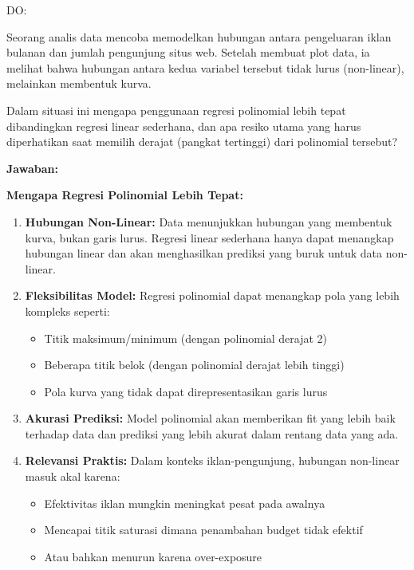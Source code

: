 \documentclass[a4paper]{article}
\begin{document}
\begin{enumerate}[itemsep=1em,leftmargin=*]
  DO:

  Seorang analis data mencoba memodelkan hubungan antara pengeluaran iklan bulanan dan jumlah pengunjung situs web. Setelah membuat plot data, ia melihat bahwa hubungan antara kedua variabel tersebut tidak lurus (non-linear), melainkan membentuk kurva.

  Dalam situasi ini mengapa penggunaan regresi polinomial lebih tepat dibandingkan regresi linear sederhana, dan apa resiko utama yang harus diperhatikan saat memilih derajat (pangkat tertinggi) dari polinomial tersebut?
  
  \textbf{Jawaban:}
  
  \textbf{Mengapa Regresi Polinomial Lebih Tepat:}
  
  \begin{enumerate}
    \item \textbf{Hubungan Non-Linear:} Data menunjukkan hubungan yang membentuk kurva, bukan garis lurus. Regresi linear sederhana hanya dapat menangkap hubungan linear dan akan menghasilkan prediksi yang buruk untuk data non-linear.
    
    \item \textbf{Fleksibilitas Model:} Regresi polinomial dapat menangkap pola yang lebih kompleks seperti:
    \begin{itemize}
      \item Titik maksimum/minimum (dengan polinomial derajat 2)
      \item Beberapa titik belok (dengan polinomial derajat lebih tinggi)
      \item Pola kurva yang tidak dapat direpresentasikan garis lurus
    \end{itemize}
    
    \item \textbf{Akurasi Prediksi:} Model polinomial akan memberikan fit yang lebih baik terhadap data dan prediksi yang lebih akurat dalam rentang data yang ada.
    
    \item \textbf{Relevansi Praktis:} Dalam konteks iklan-pengunjung, hubungan non-linear masuk akal karena:
    \begin{itemize}
      \item Efektivitas iklan mungkin meningkat pesat pada awalnya
      \item Mencapai titik saturasi dimana penambahan budget tidak efektif
      \item Atau bahkan menurun karena over-exposure
    \end{itemize}
  \end{enumerate}
  

\end{enumerate}
\end{document}
